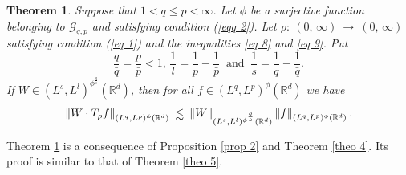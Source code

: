 \documentclass[a4paper,12pt,intlimits,oneside]{amsart}
\numberwithin{equation}{section}
\newtheorem{theorem}{Theorem}[section]
\numberwithin{equation}{section}
\def\lsim{\raisebox{-1ex}{$~\stackrel{\textstyle <}{\sim}~$}}
\theoremstyle{definition}
\begin{document}
\begin{theorem}\label{theo 6}
Suppose that $1 < q\leq p < \infty$. Let $\phi$ be a surjective function belonging to $ \mathcal{G}_{q,p}$ and satisfying condition (\ref{eqq 2}). Let  $\rho : \: (0,\, \infty) \:  \to \: (0, \,\infty) \:$ satisfying condition (\ref{eq 1}) and the inequalities \eqref{eq 8} and \eqref{eq 9}.  
Put
 $$\frac{q}{\bar{q}} = \frac{p}{\bar{p}}<1,\, \frac{1}{l} = \frac{1}{p} -\frac{1}{\bar{p}} \: \text{ and } \: \frac{1}{s} = \frac{1}{q} -\frac{1}{\bar{q}}. $$
 If $W \in (L^{s},L^{l})^{\phi^{\frac{q}{s}}}(\mathbb{R}^{d})$, then for all  $f \in (L^{q},L^{p})^{\phi}(\mathbb{R}^{d})$ we have
 $$\left\Vert W \cdot T_{\rho}f \right\Vert_{(L^{q},L^{p})^{\phi}(\mathbb{R}^{d})} \lsim \left\Vert W  \right\Vert_{(L^{s},L^{l})^{\phi^{\frac{q}{s}}}(\mathbb{R}^{d})} \left\Vert f  \right\Vert_{(L^{q},L^{p})^{\phi}(\mathbb{R}^{d})}.$$  
\end{theorem}
Theorem \ref{theo 6} is a consequence of Proposition \ref{prop 2} and Theorem \ref{theo 4}. Its proof is similar to that of Theorem \ref{theo 5}.
\end{document}
